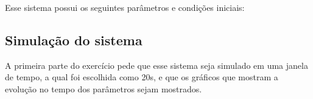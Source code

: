 \documentclass[12pt]{article}
\begin{document}
    Esse sistema possui os seguintes parâmetros e condições iniciais:
    \begin{table}[H]%
        \centering
        \qquad
        \caption{Condições iniciais e constantes do sistema}%
        \label{tbl:table}%
      \end{table}
    \subsection{Simulação do sistema}
    A primeira parte do exercício pede que esse sistema seja simulado em uma janela de tempo, a qual foi escolhida como 20s, e que os gráficos que mostram a evolução no tempo dos parâmetros sejam mostrados.
\end{document}
